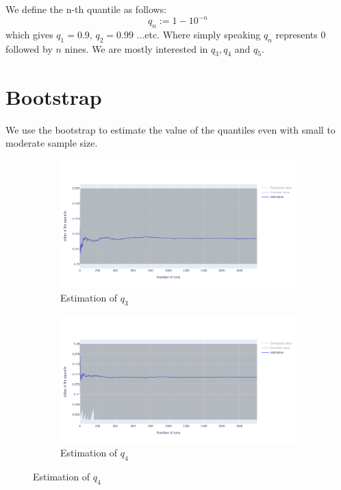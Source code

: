 \documentclass{article}
\begin{document}
We define the n-th quantile as follows:
\begin{equation}
    q_n := 1 - 10^{-n}
\end{equation}
which gives $q_1 = 0.9$, $q_2 = 0.99$ ...etc. Where simply speaking $q_n$ represents 0 followed by $n$ nines. We are mostly interested in $q_3, q_4$ and $q_5$.

\section{Bootstrap}
We use the bootstrap to estimate the value of the quantiles even with small to moderate sample size.

\begin{figure}
    \centering
    \begin{subfigure}{.8 \textwidth}
        \includegraphics[width=\textwidth]{images/estimation_q3.png}
        \caption{Estimation of $q_3$}
    \end{subfigure}
    \hfill
    \begin{subfigure}{.8 \textwidth}
        \includegraphics[width=\textwidth]{images/estimation_q4.png}
        \caption{Estimation of $q_4$}

\end{subfigure}
\end{figure}
\end{document}
